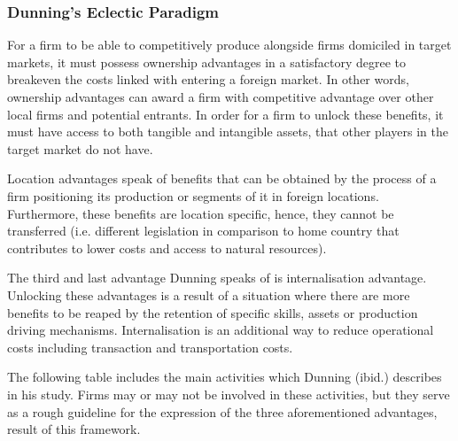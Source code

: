 \documentclass[11pt,a4paper]{article}
\begin{document}
{{\vspace{-2mm}
\subsubsection{Dunning's Eclectic Paradigm}
\vspace{-2mm}
 \par
For a firm to be able to competitively produce alongside firms domiciled in target markets, it must possess ownership advantages in a satisfactory degree to breakeven the costs linked with entering a foreign market. In other words, ownership advantages can award a firm with competitive advantage over other local firms and potential entrants. In order for a firm to unlock these benefits, it must have access to both tangible and intangible assets, that other players in the target market do not have.  \par
Location advantages speak of benefits that can be obtained by the process of a firm positioning its production or segments of it in foreign locations. Furthermore, these benefits are location specific, hence, they cannot be transferred (i.e. different legislation in comparison to home country that contributes to lower costs and access to natural resources). \par
The third and last advantage Dunning speaks of is internalisation advantage. Unlocking these advantages is a result of a situation where there are more benefits to be reaped by the retention of specific skills, assets or production driving mechanisms. Internalisation is an additional way to reduce operational costs including transaction and transportation costs. \par
The following table includes the main activities which Dunning (ibid.) describes in his study. Firms may or may not be involved in these activities, but they serve as a rough guideline for the expression of the three aforementioned advantages, result of this framework. 

}}
\end{document}
